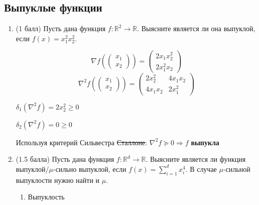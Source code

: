 \documentclass[a5paper,twoside,russian]{article}
\begin{document}
\subsection*{Выпуклые функции}
\begin{enumerate}[label=\textbf{Задача \arabic*.}]
    \item (1 балл) Пусть дана функция $f: \mathbb{R}^2 \to \mathbb{R}$. Выясните является ли она выпуклой, если $f(x) = x_1^2 x_2^2$.
    
    \begin{prf}
        \[
        \nabla f \left( 
        \begin{pmatrix}
            x_1 \\
            x_2
        \end{pmatrix}
        \right) = 
        \begin{pmatrix}
            2 x_1 x_2^2 \\
            2 x_1^2 x_2
        \end{pmatrix}
        \]
        \[
        \nabla^2 f 
        \left(
        \begin{pmatrix}
            x_1 \\
            x_2
        \end{pmatrix}
        \right) = 
        \begin{pmatrix}
            2 x_2^2 & 4 x_1 x_2 \\
            4 x_1 x_2 & 2 x_1^2
        \end{pmatrix}
        \]

        $\delta_1 (\nabla^2 f) = 2 x_2^2 \geq 0$

        $\delta_2 (\nabla^2 f) = 0 \geq 0$

        Используя критерий Сильвестра \sout{Сталлоне}: $\nabla^2 f \succeq 0 \Rightarrow f $ \textbf{выпукла}

    \end{prf}

    \item (1.5 балла) Пусть дана функция $f: \mathbb{R}^d \to \mathbb{R}$. Выясните является ли функция выпуклой/$\mu$-сильно выпуклой, если $f(x) = \sum\limits_{i=1}^{d} x_i^4$. В случае $\mu$-сильной выпуклости нужно найти и $\mu$.
    
    \begin{prf}
        \begin{enumerate}
            \item Выпуклость
            

\end{enumerate}
\end{prf}
\end{enumerate}
\end{document}
